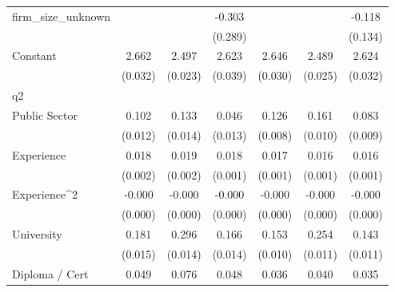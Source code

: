 {\begin{tabular}{l*{6}{c}}
firm\_size\_unknown   &                     &                     &      -0.303         &                     &                     &      -0.118         \\
                    &                     &                     &     (0.289)         &                     &                     &     (0.134)         \\
Constant            &       2.662\sym{***}&       2.497\sym{***}&       2.623\sym{***}&       2.646\sym{***}&       2.489\sym{***}&       2.624\sym{***}\\
                    &     (0.032)         &     (0.023)         &     (0.039)         &     (0.030)         &     (0.025)         &     (0.032)         \\
\hline
q2                  &                     &                     &                     &                     &                     &                     \\
Public Sector       &       0.102\sym{***}&       0.133\sym{***}&       0.046\sym{***}&       0.126\sym{***}&       0.161\sym{***}&       0.083\sym{***}\\
                    &     (0.012)         &     (0.014)         &     (0.013)         &     (0.008)         &     (0.010)         &     (0.009)         \\
Experience          &       0.018\sym{***}&       0.019\sym{***}&       0.018\sym{***}&       0.017\sym{***}&       0.016\sym{***}&       0.016\sym{***}\\
                    &     (0.002)         &     (0.002)         &     (0.001)         &     (0.001)         &     (0.001)         &     (0.001)         \\
Experience^{2}      &      -0.000\sym{***}&      -0.000\sym{***}&      -0.000\sym{***}&      -0.000\sym{***}&      -0.000\sym{***}&      -0.000\sym{***}\\
                    &     (0.000)         &     (0.000)         &     (0.000)         &     (0.000)         &     (0.000)         &     (0.000)         \\
University          &       0.181\sym{***}&       0.296\sym{***}&       0.166\sym{***}&       0.153\sym{***}&       0.254\sym{***}&       0.143\sym{***}\\
                    &     (0.015)         &     (0.014)         &     (0.014)         &     (0.010)         &     (0.011)         &     (0.011)         \\
Diploma / Cert      &       0.049\sym{***}&       0.076\sym{***}&       0.048\sym{***}&       0.036\sym{***}&       0.040\sym{***}&       0.035\sym{***}\\

\end{tabular}}
